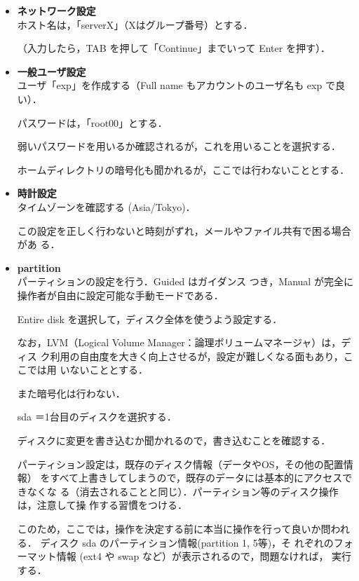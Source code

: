 \begin{itemize}
\item{\bf ネットワーク設定}\\

ホスト名は，「serverX」（Xはグループ番号）とする．

（入力したら，TAB を押して「Continue」までいって Enter を押す）．

\item{\bf 一般ユーザ設定}\\

ユーザ「exp」を作成する（Full name もアカウントのユーザ名も exp で良い）．

パスワードは，「root00」とする．

弱いパスワードを用いるか確認されるが，これを用いることを選択する．

ホームディレクトリの暗号化も聞かれるが，ここでは行わないこととする．

\item{\bf 時計設定}\\

タイムゾーンを確認する (Asia/Tokyo)．

この設定を正しく行わないと時刻がずれ，メールやファイル共有で困る場合があ
     る．

\item{\bf partition}\\

パーティションの設定を行う．Guided はガイダンス
つき，Manual が完全に操作者が自由に設定可能な手動モードである．

Entire disk を選択して，ディスク全体を使うよう設定する．

なお，LVM（Logical Volume Manager：論理ボリュームマネージャ）は，ディス
ク利用の自由度を大きく向上させるが，設定が難しくなる面もあり，ここでは用
いないこととする．

また暗号化は行わない．

sda ＝1台目のディスクを選択する．

ディスクに変更を書き込むか聞かれるので，書き込むことを確認する．

パーティション設定は，既存のディスク情報（データやOS，その他の配置情報）
をすべて上書きしてしまうので，既存のデータには基本的にアクセスできなくな
る（消去されることと同じ）．パーティション等のディスク操作は，注意して操
作する習慣をつける．

このため，ここでは，操作を決定する前に本当に操作を行って良いか問われる．
ディスク sda のパーティション情報(partition 1, 5等)，そ
れぞれのフォーマット情報 (ext4 や swap など）が表示されるので，問題なければ，
実行する．


\end{itemize}
